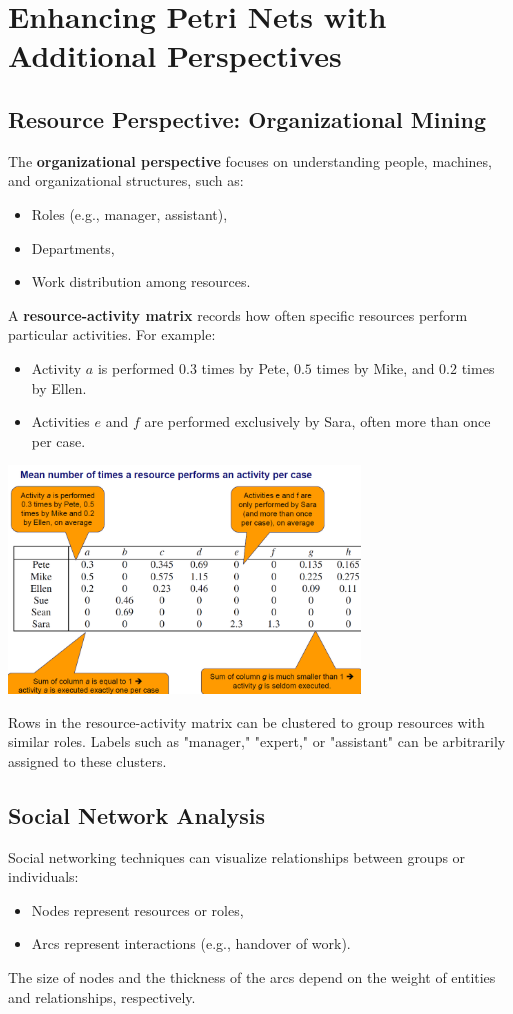 \section{Enhancing Petri Nets with Additional Perspectives}

\subsection{Resource Perspective: Organizational Mining}
The \textbf{organizational perspective} focuses on understanding people, machines, and organizational structures, such as:
\begin{itemize}
    \item Roles (e.g., manager, assistant),
    \item Departments,
    \item Work distribution among resources.
\end{itemize}

A \textbf{resource-activity matrix} records how often specific resources perform particular activities. For example:
\begin{itemize}
    \item Activity \(a\) is performed \(0.3\) times by Pete, \(0.5\) times by Mike, and \(0.2\) times by Ellen.
    \item Activities \(e\) and \(f\) are performed exclusively by Sara, often more than once per case.
\end{itemize}
\begin{center}
    \includegraphics[width=0.7\textwidth]{capitolo 8/slide20.png}
\end{center}

Rows in the resource-activity matrix can be clustered to group resources with similar roles. Labels such as "manager," "expert," or "assistant" can be arbitrarily assigned to these clusters.

\subsection{Social Network Analysis}
Social networking techniques can visualize relationships between groups or individuals:
\begin{itemize}
    \item Nodes represent resources or roles,
    \item Arcs represent interactions (e.g., handover of work).
\end{itemize}
The size of nodes and the thickness of the arcs depend on the weight of entities and relationships, respectively.

